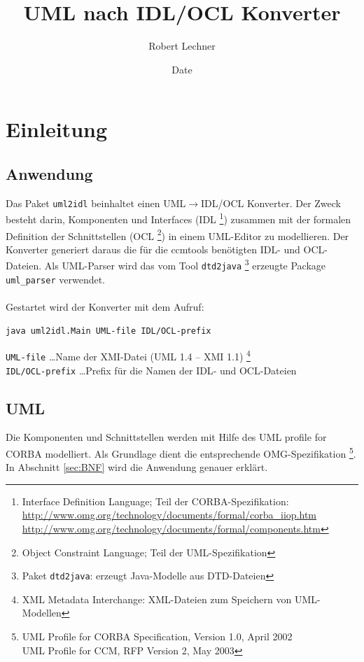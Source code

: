 \documentclass [a4paper,10pt] {scrartcl}
\author{Robert Lechner}
\title{UML nach IDL/OCL Konverter}
\date{$ $Date$ $}
\begin{document}
\maketitle
\tableofcontents
\cleardoublepage

\section{Einleitung}
\subsection{Anwendung}
Das Paket \texttt{uml2idl} beinhaltet einen \textsf{UML}$\rightarrow$\textsf{IDL/OCL}
Konverter. Der Zweck besteht darin, Komponenten und Interfaces (\textsf{IDL}
\footnote{Interface Definition Language; Teil der CORBA-Spezifikation:\\
\url{http://www.omg.org/technology/documents/formal/corba_iiop.htm}\\
\url{http://www.omg.org/technology/documents/formal/components.htm}
}) zusammen mit der
formalen Definition der Schnittstellen (\textsf{OCL}
\footnote{Object Constraint Language; Teil der UML-Spezifikation}) in einem \textsf{UML}-Editor
zu modellieren. Der Konverter generiert daraus die f{\"u}r die \textsf{ccmtools} ben{\"o}tigten
\textsf{IDL}- und \textsf{OCL}-Dateien.
Als \textsf{UML}-Parser wird das vom Tool \texttt{dtd2java}
\footnote{Paket \texttt{dtd2java}: erzeugt Java-Modelle aus DTD-Dateien}
erzeugte Package \texttt{uml\_parser} verwendet. \\
~\\
Gestartet wird der Konverter mit dem Aufruf:
\begin{verbatim}
java uml2idl.Main UML-file IDL/OCL-prefix
\end{verbatim}
\texttt{UML-file} \dots Name der \textsf{XMI}-Datei (\textsf{UML} 1.4 -- \textsf{XMI} 1.1)
\footnote{XML Metadata Interchange: XML-Dateien zum Speichern von UML-Modellen}\\
\texttt{IDL/OCL-prefix} \dots Prefix f{\"u}r die Namen der \textsf{IDL}- und \textsf{OCL}-Dateien
\subsection{UML}
Die Komponenten und Schnittstellen werden mit Hilfe des \textsf{UML profile for CORBA}
modelliert. Als Grundlage dient die entsprechende \textsf{OMG}-Spezifikation
\footnote{UML Profile for CORBA Specification, Version 1.0, April 2002\\
UML Profile for CCM, RFP Version 2, May 2003}.\\
In Abschnitt \ref{sec:BNF} wird die Anwendung genauer erkl{\"a}rt.
\end{document}

